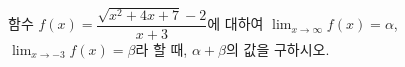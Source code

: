 함수 $f(x)=\dfrac{\sqrt{x^2+4x+7}-2}{x+3}$에 대하여 $\displaystyle\lim_{x\to\infty} f(x)=\alpha$, $\displaystyle\lim_{x\to -3} f(x)=\beta$라 할 때, $\alpha+\beta$의 값을 구하시오.
